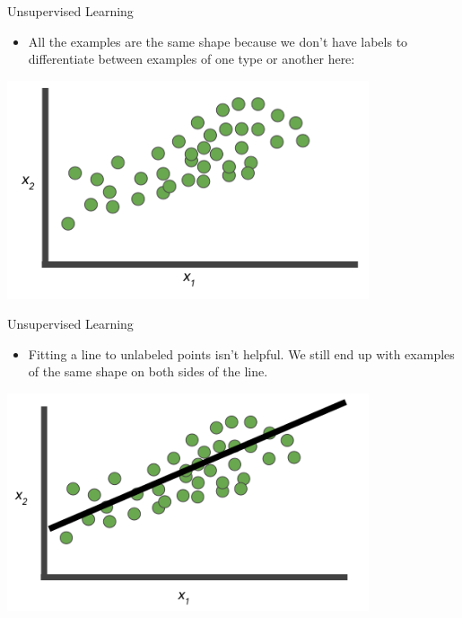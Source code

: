 \documentclass{beamer}
\begin{document}

\begin{frame}{Unsupervised Learning}

\begin{itemize}
\item All the examples are the same shape because we don't have labels to differentiate between examples of one type or another here:
\end{itemize}

\medskip

\includegraphics[width=0.8\textwidth]{images/Graph4.png}

\end{frame}


\begin{frame}{Unsupervised Learning}

\begin{itemize}
\item Fitting a line to unlabeled points isn't helpful. We still end up with examples of the same shape on both sides of the line. 
\end{itemize}

\includegraphics[width=0.8\textwidth]{images/Graph5.png}

\end{frame}
\end{document}
